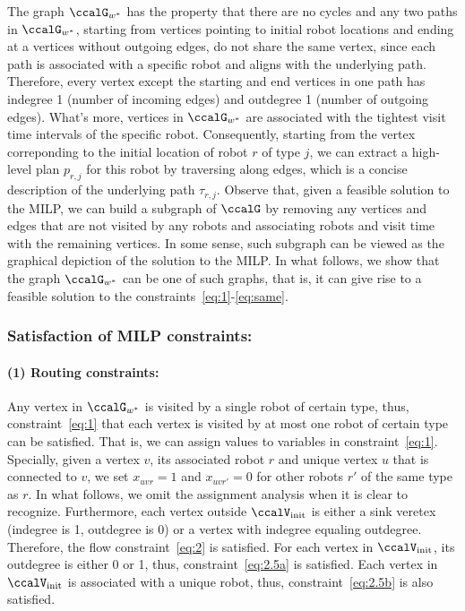 \documentclass[Afour,sageh,times]{sagej}
\begin{document}
{{The graph $\ccalG_{w^*}$ has the property that there are no cycles and any two paths in $\ccalG_{w^*}$, starting from vertices pointing to initial robot locations  and ending at a vertices without outgoing edges, do not share the same vertex, since each path is associated with a specific robot and aligns with the underlying path. Therefore, every vertex except the starting and end vertices in one path has indegree 1 (number of incoming edges) and outdegree 1 (number of outgoing edges). What's more, vertices in $\ccalG_{w^*}$ are associated with the tightest visit time intervals of the specific robot. Consequently, starting from the vertex correponding to the initial location of robot $r$ of type $j$, we can extract a high-level plan $p_{r,j}$ for this robot by traversing along edges, which is a concise description of the underlying path $\tau_{r,j}$. Observe that, given a feasible solution to the MILP, we can build a subgraph of $\ccalG$ by removing any vertices and edges that are not visited by any robots and associating robots and visit time with the remaining vertices. In some sense, such subgraph can be viewed as the graphical depiction of the solution to the MILP. In what follows, we show that the graph $\ccalG_{w^*}$ can be one of such graphs, that is, it can give rise to a feasible solution to the constraints~\eqref{eq:1}-\eqref{eq:same}.

\subsubsection{Satisfaction of MILP constraints:}\label{app:milp}
\paragraph{(1) Routing constraints:} Any vertex in $\ccalG_{w^*}$ is visited by a single robot of certain type, thus, constraint~\eqref{eq:1} that each vertex is visited by at most one robot of certain type can be  satisfied. That is, we can assign values to variables in constraint~\eqref{eq:1}. Specially, given a vertex $v$, its associated robot $r$ and unique vertex $u$ that is connected to $v$, we set $x_{uvr}=1$  and $x_{uvr'}=0$ for other robots $r'$ of the same type as $r$. In what follows, we omit the assignment analysis when it is clear to recognize. Furthermore, each vertex outside $\ccalV_{\text{init}}$  is either a sink veretex (indegree is 1, outdegree is 0) or a vertex with indegree equaling outdegree. Therefore, the flow constraint~\eqref{eq:2} is satisfied. For each vertex in $\ccalV_\text{init}$, its outdegree is either 0 or 1, thus, constraint~\eqref{eq:2.5a} is satisfied. Each vertex in $\ccalV_\text{init}$ is associated with a unique robot, thus, constraint~\eqref{eq:2.5b} is also satisfied.
}}
\end{document}
